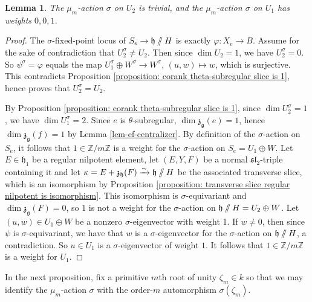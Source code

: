 \documentclass{article} %
\newtheorem{lemma}[proposition]{Lemma}
\numberwithin{equation}{section}
\theoremstyle{definition}
\newcommand{\GIT}{\mathbin{/\mkern-6mu/}}
\newcommand{\Z}{\mathbb{Z}}
\newcommand{\frakg}{\mathfrak g}
\newcommand{\frakh}{\mathfrak h}
\newcommand{\frakz}{\mathfrak z}
\newcommand{\fraksl}{\mathfrak{sl}}
\newcommand{\bZ}{\mathbb Z}
\begin{document}
\begin{lemma}\label{lemma: sigma action on U1 and U2}
    The $\mu_m$-action $\sigma$ on $U_2$ is trivial, and the $\mu_m$-action $\sigma$ on $U_1$ has weights $0,0,1$.
\end{lemma}
\begin{proof}
    The $\sigma$-fixed-point locus of $S_e\rightarrow \frakh \GIT H$ is exactly $\varphi\colon X_e \rightarrow B$. 
    Assume for the sake of contradiction that $U_2^{\sigma} \neq U_2$.
    Then since $\dim U_2 = 1$, we have $U_2^{\sigma} = 0$. 
    So $\psi^{\sigma} = \varphi$ equals the map $U_1^{\sigma} \oplus W^{\sigma} \rightarrow W^{\sigma}$, $(u,w)\mapsto w$, which is surjective. 
    This contradicts Proposition \ref{proposition: corank theta-subregular slice is 1}, hence proves that $U_2^{\sigma} = U_2$.
    
    By Proposition \ref{proposition: corank theta-subregular slice is 1}, since $\dim U_2^{\sigma} = 1$, we have $\dim U_1^{\sigma} = 2$.
    Since $e$ is $\theta$-subregular, $\dim \frakz_{\frakg}(e) =1$, hence $\dim \frakz_{\frakg}(f) = 1$ by Lemma \ref{lem-ef-centralizer}.
    By definition of the $\sigma$-action on $S_e$, it follows that $1\in \Z/m\Z$ is a weight for the $\sigma$-action on $S_e = U_1 \oplus W$.
    Let $E\in \frakh_1$ be a regular nilpotent element, let $(E,Y,F)$ be a normal $\fraksl_2$-triple containing it and let $\kappa = E + \frakz_{\frakh}(F) \xrightarrow{\sim} \frakh \GIT H$ be the associated transverse slice, which is an isomorphism by Proposition \ref{proposition: transverse slice regular nilpotent is isomorphism}.
    This isomorphism is $\sigma$-equivariant and $\dim \frakz_{\frakg}(F) = 0$, so $1$ is not a weight for the $\sigma$-action on $\frakh \GIT H = U_2 \oplus W$.
    Let $(u, w) \in U_1 \oplus W$ be a nonzero $\sigma$-eigenvector with weight 1. If $w \neq 0$, then since $\psi$ is $\sigma$-equivariant, we have that $w$ is a $\sigma$-eigenvector for the $\sigma$-action on $\frakh\GIT H$, a contradiction. So $u \in U_1$ is a $\sigma$-eigenvector of weight $1$.
    It follows that $1 \in \bZ/m\bZ$ is a weight for $U_1$.
\end{proof}



In the next proposition, fix a primitive $m$th root of unity $\zeta_m\in k$ so that we may identify the $\mu_m$-action $\sigma$ with the order-$m$ automorphism $\sigma(\zeta_m)$.
\end{document}

